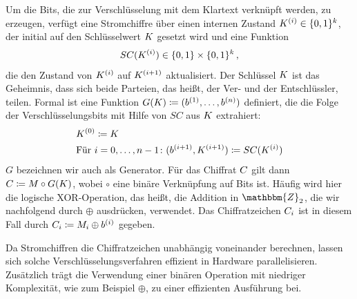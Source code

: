 Um die Bits, die zur Verschlüsselung mit dem Klartext verknüpft werden, zu erzeugen, verfügt eine Stromchiffre über einen internen Zustand $K^{(i)} \in \{0,1\}^k$, der initial auf den Schlüsselwert $K$ gesetzt wird und eine Funktion
\begin{align*}
	SC(K^{(i)}) \in \{0,1\} \times \{0,1\}^k\, ,
\end{align*}
die den Zustand von $K^{(i)}$ auf $K^{(i+1)}$ aktualisiert. Der Schlüssel $K$ ist das Geheimnis, dass sich beide Parteien, das heißt, der Ver- und der Entschlüssler, teilen. Formal ist eine Funktion $G(K) \coloneqq (b^{(1)},\dots,b^{(n)})$ definiert, die die Folge der Verschlüsselungsbits mit Hilfe von $SC$ aus $K$ extrahiert:
\begin{align*}
	&K^{(0)} \coloneqq K\\
	&\textnormal{Für } i = 0,\dots,n-1\colon (b^{(i+1)},K^{(i+1)}) \coloneqq SC(K^{(i)}) 
\end{align*}
$G$ bezeichnen wir auch als Generator. Für das Chiffrat $C$ gilt dann $C \coloneqq M \circ G(K)$, wobei $\circ$ eine binäre Verknüpfung auf Bits ist. Häufig wird hier die logische XOR-Operation, das heißt, die Addition in $\mathbbm{Z}_{2}$, die wir nachfolgend durch $\oplus$ ausdrücken, verwendet. Das Chiffratzeichen $C_{i}$ ist in diesem Fall durch $C_{i} \coloneqq M_{i} \oplus b^{(i)}$ gegeben. 

Da Stromchiffren die Chiffratzeichen unabhängig voneinander berechnen, lassen sich solche Verschlüsselungsverfahren effizient in Hardware parallelisieren. Zusätzlich trägt die Verwendung einer binären Operation mit niedriger Komplexität, wie zum Beispiel $\oplus$, zu einer effizienten Ausführung bei.

